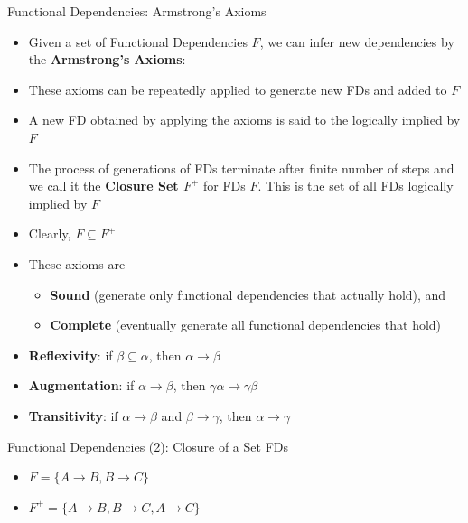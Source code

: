 \documentclass[aspectratio=169, xcolor=dvipsnames]{beamer}
\begin{document}
\begin{frame}{Functional Dependencies: Armstrong's Axioms}
    \begin{itemize}[<+->]
        \item Given a set of Functional Dependencies $F$, we can infer new dependencies by the \textbf{Armstrong's Axioms}:
        \item These axioms can be repeatedly applied to generate new FDs and added to $F$
        \item A new FD obtained by applying the axioms is said to the logically implied by $F$
        \item The process of generations of FDs terminate after finite number of steps and we call it the \textbf{Closure Set $F^+$} for FDs $F$. This is the set of all FDs logically implied by $F$
        \item Clearly, $F \subseteq F^+$
        \item These axioms are
        \begin{itemize}
            \item[$\triangleright$] \textbf{Sound} (generate only functional dependencies that actually hold), and
            \item[$\triangleright$] \textbf{Complete} (eventually generate all functional dependencies that hold)
        \end{itemize}
        \item \textbf{Reflexivity}: if $\beta \subseteq \alpha$, then $\alpha \rightarrow \beta$
        \item \textbf{Augmentation}: if $\alpha \rightarrow \beta$, then $\gamma\alpha \rightarrow \gamma\beta$
        \item \textbf{Transitivity}: if $\alpha \rightarrow \beta$ and $\beta \rightarrow \gamma$, then $\alpha \rightarrow \gamma$
    \end{itemize}
\end{frame}

\begin{frame}{Functional Dependencies (2): Closure of a Set FDs}
    \begin{itemize}[<+->]
        \item $F = \{A \rightarrow B, B \rightarrow C\}$
        \item $F^+ = \{A \rightarrow B, B \rightarrow C, A \rightarrow C\}$
    \end{itemize}
\end{frame}
\end{document}
